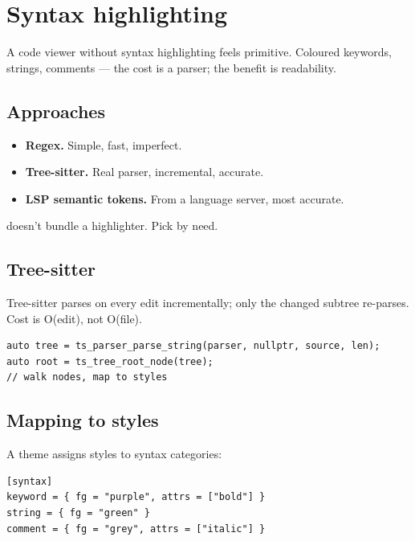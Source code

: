 \chapter{Syntax highlighting}
\label{ch:syntax}

\begin{aside}
A code viewer without syntax highlighting feels primitive.
Coloured keywords, strings, comments --- the cost is a
parser; the benefit is readability.
\end{aside}

\section{Approaches}

\begin{itemize}[leftmargin=*]
  \item \textbf{Regex.} Simple, fast, imperfect.
  \item \textbf{Tree-sitter.} Real parser, incremental, accurate.
  \item \textbf{LSP semantic tokens.} From a language server,
    most accurate.
\end{itemize}

\maya{} doesn't bundle a highlighter. Pick by need.

\section{Tree-sitter}

Tree-sitter parses on every edit incrementally; only the
changed subtree re-parses. Cost is O(edit), not O(file).

\begin{lstlisting}
auto tree = ts_parser_parse_string(parser, nullptr, source, len);
auto root = ts_tree_root_node(tree);
// walk nodes, map to styles
\end{lstlisting}

\section{Mapping to styles}

A theme assigns styles to syntax categories:

\begin{lstlisting}
[syntax]
keyword = { fg = "purple", attrs = ["bold"] }
string = { fg = "green" }
comment = { fg = "grey", attrs = ["italic"] }
\end{lstlisting}


